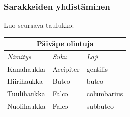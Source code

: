 \begin{frame}[fragile]
    \frametitle{Sarakkeiden yhdistäminen}

    \begin{harj}
        Luo seuraava taulukko:
        \begin{table}
            \begin{serif}
                \begin{tabular}{|l|l|l|}
                    \hline
                    \multicolumn{3}{|c|}{\Large Päiväpetolintuja}\\
                    \hline
                    \textit{Nimitys} & \textit{Suku} & \textit{Laji}\\ \hline
                    Kanahaukka & Accipiter &  gentilis\\ \hline
                    Hiirihaukka & Buteo & buteo\\ \hline
                    Tuulihaukka & Falco & columbarius\\\hline
                    Nuolihaukka & Falco & subbuteo\\ \hline
                \end{tabular}
            \end{serif}
        \end{table}
    \end{harj}

\end{frame}
